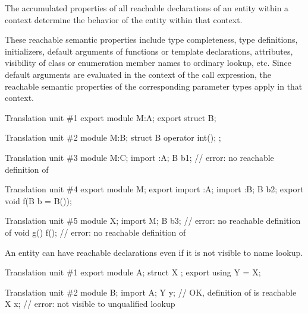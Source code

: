 \pnum
The accumulated properties of all reachable declarations of
an entity within a context
determine the behavior of the entity within that context.
\begin{note}
These reachable semantic properties include type completeness,
type definitions, initializers,
default arguments of functions or template declarations, attributes,
visibility of class or enumeration member names to ordinary lookup,
etc.
Since default arguments are evaluated in the context of the call expression,
the reachable semantic properties of the corresponding parameter types apply in
that context.
\begin{example}
\begin{codeblocktu}{Translation unit \#1}
export module M:A;
export struct B;
\end{codeblocktu}

\begin{codeblocktu}{Translation unit \#2}
module M:B;
struct B {
  operator int();
};
\end{codeblocktu}

\begin{codeblocktu}{Translation unit \#3}
module M:C;
import :A;
B b1;                           // error: no reachable definition of 
\end{codeblocktu}

\begin{codeblocktu}{Translation unit \#4}
export module M;
export import :A;
import :B;
B b2;
export void f(B b = B());
\end{codeblocktu}

\begin{codeblocktu}{Translation unit \#5}
module X;
import M;
B b3;                           // error: no reachable definition of 
void g() { f(); }               // error: no reachable definition of 
\end{codeblocktu}
\end{example}
\end{note}

\pnum
\begin{note}
An entity can have reachable declarations
even if it is not visible to name lookup.
\end{note}
\begin{example}
\begin{codeblocktu}{Translation unit \#1}
export module A;
struct X {};
export using Y = X;
\end{codeblocktu}

\begin{codeblocktu}{Translation unit \#2}
module B;
import A;
Y y;                // OK, definition of  is reachable
X x;                // error:  not visible to unqualified lookup
\end{codeblocktu}
\end{example}
